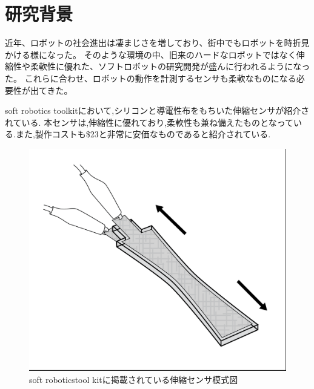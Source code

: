 \section{研究背景}
近年、ロボットの社会進出は凄まじさを増しており、街中でもロボットを時折見かける様になった。
そのような環境の中、旧来のハードなロボットではなく伸縮性や柔軟性に優れた、ソフトロボットの研究開発が盛んに行われるようになった。
これらに合わせ、ロボットの動作を計測するセンサも柔軟なものになる必要性が出てきた。

soft robotics toolkit\cite{MITSoftRobot}において,シリコンと導電性布をもちいた伸縮センサが紹介されている.
本センサは,伸縮性に優れており,柔軟性も兼ね備えたものとなっている.また,製作コストも\$23と非常に安価なものであると紹介されている.
\begin{figure}[h]
    \begin{center}
        \includegraphics[width=0.5\columnwidth,bb=0 0 906 785]{Photo/BackGround/MITSoftRobotics.png}
        \caption{soft roboticstool kitに掲載されている伸縮センサ模式図\cite{MITSoftRobot}}
        \label{MITSoftRobot表紙}
    \end{center}
\end{figure}

